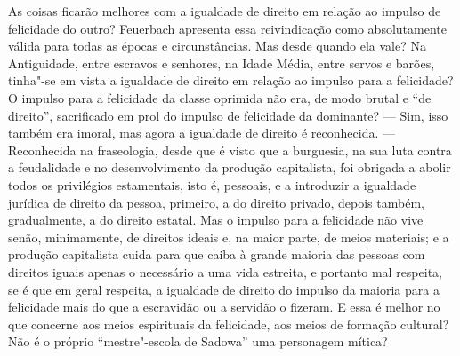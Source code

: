 As coisas ficarão melhores com a igualdade de direito em relação ao
impulso de felicidade do
outro? Feuerbach 
apresenta essa reivindicação como absolutamente válida para todas as
épocas e circunstâncias. Mas desde quando ela vale? Na Antiguidade,
entre escravos e senhores, na Idade Média, entre servos e barões,
tinha"-se em vista a igualdade de direito em relação ao impulso para a
felicidade? O impulso para a felicidade da classe oprimida não era, de
modo brutal e ``de direito'', sacrificado em prol do impulso de
felicidade da dominante? --- Sim, isso também era imoral, mas agora a
igualdade de direito é reconhecida. --- Reconhecida na fraseologia, desde
que é visto que a burguesia, na sua luta contra a feudalidade e no
desenvolvimento da produção capitalista, foi obrigada a abolir todos os
privilégios estamentais, isto é, pessoais, e a introduzir a igualdade
jurídica de direito da pessoa, primeiro, a do direito privado, depois
também, gradualmente, a do direito estatal. Mas o impulso para a
felicidade não vive senão, minimamente, de direitos ideais e, na maior
parte, de meios materiais; e a produção capitalista cuida para que caiba
à grande maioria das pessoas com direitos iguais apenas o necessário a
uma vida estreita, e portanto mal respeita, se é que em geral respeita, a
igualdade de direito do impulso da maioria para a felicidade mais do que
a escravidão ou a servidão o fizeram. E essa é melhor no que concerne %
aos meios espirituais da felicidade, aos meios de formação cultural? Não
é o próprio ``mestre"-escola de Sadowa'' uma
personagem mítica?

